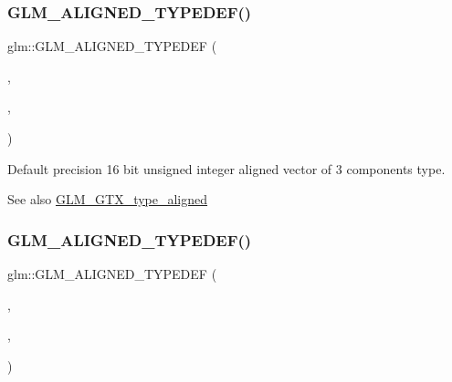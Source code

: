 \subsubsection{\texorpdfstring{G\+L\+M\+\_\+\+A\+L\+I\+G\+N\+E\+D\+\_\+\+T\+Y\+P\+E\+D\+E\+F()}{GLM\_ALIGNED\_TYPEDEF()}\hspace{0.1cm}{\footnotesize\ttfamily [127/209]}}
{\footnotesize\ttfamily glm\+::\+G\+L\+M\+\_\+\+A\+L\+I\+G\+N\+E\+D\+\_\+\+T\+Y\+P\+E\+D\+EF (\begin{DoxyParamCaption}\item[{\hyperlink{group__gtc__type__precision_ga947d0d003e016eaf2038d6843b427257}{u16vec3}}]{,  }\item[{aligned\+\_\+u16vec3}]{,  }\item[{8}]{ }\end{DoxyParamCaption})}

Default precision 16 bit unsigned integer aligned vector of 3 components type. \begin{DoxySeeAlso}{See also}
\hyperlink{group__gtx__type__aligned}{G\+L\+M\+\_\+\+G\+T\+X\+\_\+type\+\_\+aligned} 
\end{DoxySeeAlso}
\mbox{\label{group__gtx__type__aligned_gaecafb5996f5a44f57e34d29c8670741e}} 
\subsubsection{\texorpdfstring{G\+L\+M\+\_\+\+A\+L\+I\+G\+N\+E\+D\+\_\+\+T\+Y\+P\+E\+D\+E\+F()}{GLM\_ALIGNED\_TYPEDEF()}\hspace{0.1cm}{\footnotesize\ttfamily [128/209]}}
{\footnotesize\ttfamily glm\+::\+G\+L\+M\+\_\+\+A\+L\+I\+G\+N\+E\+D\+\_\+\+T\+Y\+P\+E\+D\+EF (\begin{DoxyParamCaption}\item[{\hyperlink{group__gtc__type__precision_ga87d1f39c523b4d6d4de0c2778afe5474}{u16vec4}}]{,  }\item[{aligned\+\_\+u16vec4}]{,  }\item[{8}]{ }\end{DoxyParamCaption})}

